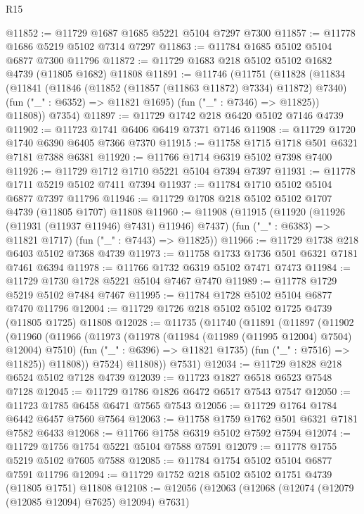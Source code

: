 \begin{lexlean}{R15}
\begin{coremodule}
{{{{{{{{{{{@11852 := @11729 @1687 @1685 @5221 @5104 @7297 @7300
@11857 := @11778 @1686 @5219 @5102 @7314 @7297
@11863 := @11784 @1685 @5102 @5104 @6877 @7300 @11796
@11872 := @11729 @1683 @218 @5102 @5102 @1682 @4739 (@11805 @1682) @11808
@11891 := @11746
    (@11751
      (@11828
        (@11834
          (@11841
            (@11846 (@11852 (@11857 (@11863 @11872) @7334) @11872) @7340)
            (fun ("_" : @6352) => @11821 @1695)
            (fun ("_" : @7346) => @11825))
          @11808))
      @7354)
@11897 := @11729 @1742 @218 @6420 @5102 @7146 @4739
@11902 := @11723 @1741 @6406 @6419 @7371 @7146
@11908 := @11729 @1720 @1740 @6390 @6405 @7366 @7370
@11915 := @11758 @1715 @1718 @501 @6321 @7181 @7388 @6381
@11920 := @11766 @1714 @6319 @5102 @7398 @7400
@11926 := @11729 @1712 @1710 @5221 @5104 @7394 @7397
@11931 := @11778 @1711 @5219 @5102 @7411 @7394
@11937 := @11784 @1710 @5102 @5104 @6877 @7397 @11796
@11946 := @11729 @1708 @218 @5102 @5102 @1707 @4739 (@11805 @1707) @11808
@11960 := @11908
    (@11915
      (@11920 (@11926 (@11931 (@11937 @11946) @7431) @11946) @7437)
      (fun ("_" : @6383) => @11821 @1717)
      (fun ("_" : @7443) => @11825))
@11966 := @11729 @1738 @218 @6403 @5102 @7368 @4739
@11973 := @11758 @1733 @1736 @501 @6321 @7181 @7461 @6394
@11978 := @11766 @1732 @6319 @5102 @7471 @7473
@11984 := @11729 @1730 @1728 @5221 @5104 @7467 @7470
@11989 := @11778 @1729 @5219 @5102 @7484 @7467
@11995 := @11784 @1728 @5102 @5104 @6877 @7470 @11796
@12004 := @11729 @1726 @218 @5102 @5102 @1725 @4739 (@11805 @1725) @11808
@12028 := @11735
    (@11740
      (@11891
        (@11897
          (@11902
            (@11960
              (@11966
                (@11973
                  (@11978 (@11984 (@11989 (@11995 @12004) @7504) @12004) @7510)
                  (fun ("_" : @6396) => @11821 @1735)
                  (fun ("_" : @7516) => @11825))
                @11808))
            @7524)
          @11808))
      @7531)
@12034 := @11729 @1828 @218 @6524 @5102 @7128 @4739
@12039 := @11723 @1827 @6518 @6523 @7548 @7128
@12045 := @11729 @1786 @1826 @6472 @6517 @7543 @7547
@12050 := @11723 @1785 @6458 @6471 @7565 @7543
@12056 := @11729 @1764 @1784 @6442 @6457 @7560 @7564
@12063 := @11758 @1759 @1762 @501 @6321 @7181 @7582 @6433
@12068 := @11766 @1758 @6319 @5102 @7592 @7594
@12074 := @11729 @1756 @1754 @5221 @5104 @7588 @7591
@12079 := @11778 @1755 @5219 @5102 @7605 @7588
@12085 := @11784 @1754 @5102 @5104 @6877 @7591 @11796
@12094 := @11729 @1752 @218 @5102 @5102 @1751 @4739 (@11805 @1751) @11808
@12108 := @12056
    (@12063
      (@12068 (@12074 (@12079 (@12085 @12094) @7625) @12094) @7631)
}}}}}}}}}}}
\end{coremodule}
\end{lexlean}
